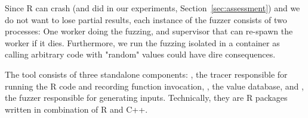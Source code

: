 \documentclass[sigplan,nonacm,anonymous,review]{acmart}
\begin{document}

Since R can crash (and did in our experiments, \Cf Section~\ref{sec:assessment}) and we do not want to lose partial results, each instance of the fuzzer consists of two processes:
One worker doing the fuzzing, and supervisor that can re-spawn the worker if it dies.
Furthermore, we run the fuzzing isolated in a container as calling arbitrary code with "random" values could have dire consequences.

The tool consists of three standalone components: , the tracer responsible for running the R code and recording function invocation, , the value database, and , the fuzzer responsible for generating inputs.
Technically, they are R packages written in combination of R and C++.
\end{document}
